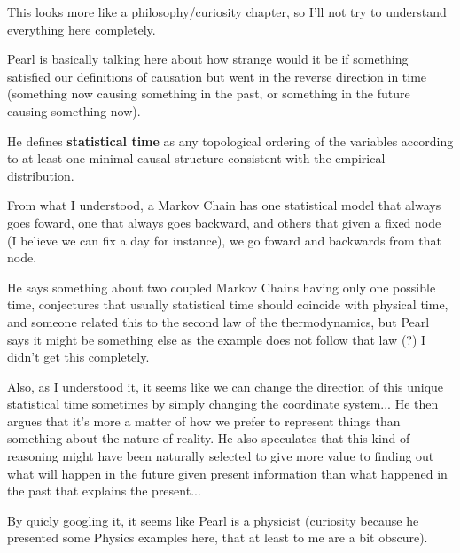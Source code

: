 This looks more like a philosophy/curiosity chapter, so I'll not try to understand everything here completely.

Pearl is basically talking here about how strange would it be if something satisfied our definitions of causation but went in the reverse direction in time (something now causing something in the past, or something in the future causing something now).

He defines \textbf{statistical time} as any topological ordering of the variables according to at least one minimal causal structure consistent with the empirical distribution.

From what I understood, a Markov Chain has one statistical model that always goes foward, one that always goes backward, and others that given a fixed node (I believe we can fix a day for instance), we go foward and backwards from that node.

He says something about two coupled Markov Chains having only one possible time, conjectures that usually statistical time should coincide with physical time, and someone related this to the second law of the thermodynamics, but Pearl says it might be something else as the example does not follow that law (?) I didn't get this completely.

Also, as I understood it, it seems like we can change the direction of this unique statistical time sometimes by simply changing the coordinate system... He then argues that it's more a matter of how we prefer to represent things than something about the nature of reality. He also speculates that this kind of reasoning might have been naturally selected to give more value to finding out what will happen in the future given present information than what happened in the past that explains the present...

By quicly googling it, it seems like Pearl is a physicist (curiosity because he presented some Physics examples here, that at least to me are a bit obscure).
